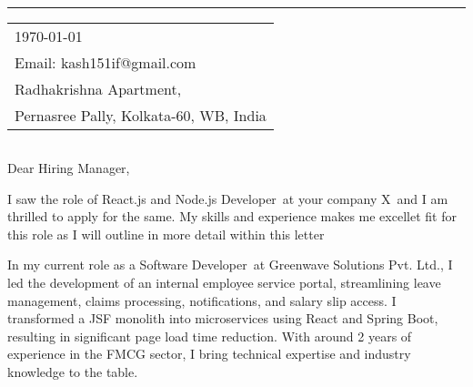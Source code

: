 \documentclass{article}
\newcommand\companyName{X}
\newcommand\currentRole{Software Developer}
\newcommand\currentCompany{Greenwave Solutions Pvt. Ltd.}
\newcommand\jobRole{React.js and Node.js Developer}
\begin{document}


\vspace{-1em} %

\rule{\linewidth}{1pt} %

\bigskip\bigskip %


\hfill
\begin{tabular}{l @{}}
\hfill \today \bigskip\\ %
\hfill Email: kash151if@gmail.com \\
\hfill Radhakrishna Apartment,\\
\hfill Pernasree Pally, Kolkata-60, WB, India \\ %
\end{tabular}

\bigskip %


\begin{tabular}{@{} l}

\end{tabular}

\bigskip %

Dear Hiring Manager,

\bigskip %

I saw the role of 
\jobRole\ at your company \companyName\ and I am thrilled to apply for the same. My skills and experience makes me excellet fit for this role as I will outline in more detail within this letter  


In my current role as a \currentRole\ at \currentCompany, I led the development of an internal employee service portal, streamlining leave management, claims processing, notifications, and salary slip access. I transformed a JSF monolith into microservices using React and Spring Boot, resulting in significant page load time reduction. With around 2 years of experience in the FMCG sector, I bring technical expertise and industry knowledge to the table.
\end{document}
